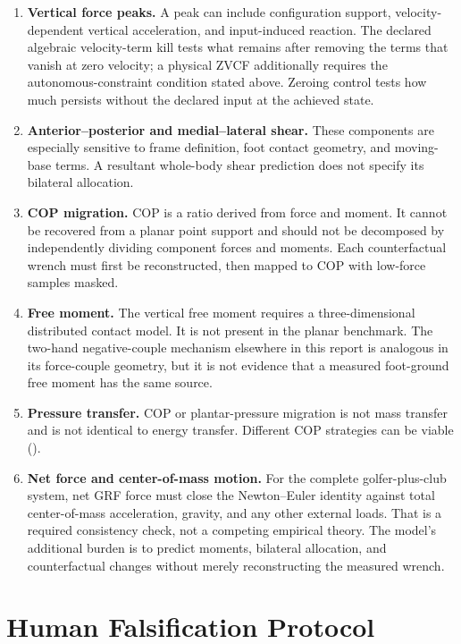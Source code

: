 \documentclass[
  letterpaper,
]{report}
\providecommand{\tightlist}{%
  \setlength{\itemsep}{0pt}\setlength{\parskip}{0pt}}
\begin{document}
\begin{enumerate}
\def\labelenumi{\arabic{enumi}.}
\tightlist
\item
  \textbf{Vertical force peaks.} A peak can include configuration
  support, velocity-dependent vertical acceleration, and input-induced
  reaction. The declared algebraic velocity-term kill tests what remains
  after removing the terms that vanish at zero velocity; a physical ZVCF
  additionally requires the autonomous-constraint condition stated
  above. Zeroing control tests how much persists without the declared
  input at the achieved state.
\item
  \textbf{Anterior--posterior and medial--lateral shear.} These
  components are especially sensitive to frame definition, foot contact
  geometry, and moving-base terms. A resultant whole-body shear
  prediction does not specify its bilateral allocation.
\item
  \textbf{COP migration.} COP is a ratio derived from force and moment.
  It cannot be recovered from a planar point support and should not be
  decomposed by independently dividing component forces and moments.
  Each counterfactual wrench must first be reconstructed, then mapped to
  COP with low-force samples masked.
\item
  \textbf{Free moment.} The vertical free moment requires a
  three-dimensional distributed contact model. It is not present in the
  planar benchmark. The two-hand negative-couple mechanism elsewhere in
  this report is analogous in its force-couple geometry, but it is not
  evidence that a measured foot-ground free moment has the same source.
\item
  \textbf{Pressure transfer.} COP or plantar-pressure migration is not
  mass transfer and is not identical to energy transfer. Different COP
  strategies can be viable ().
\item
  \textbf{Net force and center-of-mass motion.} For the complete
  golfer-plus-club system, net GRF force must close the Newton--Euler
  identity against total center-of-mass acceleration, gravity, and any
  other external loads. That is a required consistency check, not a
  competing empirical theory. The model's additional burden is to
  predict moments, bilateral allocation, and counterfactual changes
  without merely reconstructing the measured wrench.
\end{enumerate}

\section{Human Falsification
Protocol}\label{human-falsification-protocol}
\end{document}
